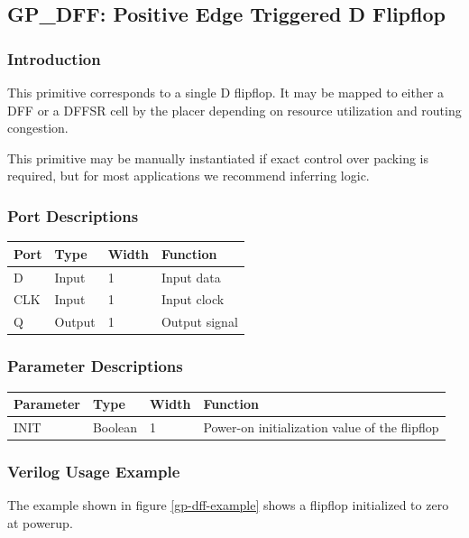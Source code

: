 \documentclass{article}
\begin{document}
\pagebreak
\subsection{GP\_DFF: Positive Edge Triggered D Flipflop}

\subsubsection{Introduction}
This primitive corresponds to a single D flipflop. It may be mapped to either a DFF or a DFFSR cell by the placer 
depending on resource utilization and routing congestion.

This primitive may be manually instantiated if exact control over packing is required, but for most applications we 
recommend inferring logic.

\subsubsection{Port Descriptions}

\begin{tabularx}{4in}{|l|l|l|X|}
\hline
{\bfseries Port} & {\bfseries Type} & {\bfseries Width} & {\bfseries Function} \\
\hline
D & Input & 1 & Input data \\
\hline
CLK & Input & 1 & Input clock \\
\hline
Q & Output & 1 & Output signal \\
\hline
\end{tabularx}

\subsubsection{Parameter Descriptions}

\begin{tabularx}{5in}{|l|l|l|X|}
\hline
{\bfseries Parameter} & {\bfseries Type} & {\bfseries Width} & {\bfseries Function} \\
\hline
INIT & Boolean & 1 & Power-on initialization value of the flipflop \\
\hline
\end{tabularx}

\subsubsection{Verilog Usage Example}

The example shown in figure \ref{gp-dff-example} shows a flipflop initialized to zero at powerup.
\end{document}
